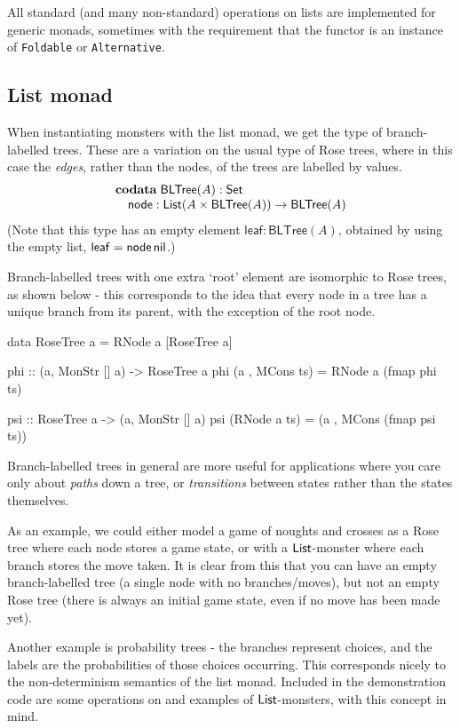 All standard (and many non-standard) operations on lists are implemented for generic monads, sometimes with the requirement that the functor is an instance of \verb+Foldable+ or \verb+Alternative+.

\subsection{List monad}

When instantiating monsters with the list monad, we get the type of branch-labelled trees. These are a variation on the usual type of Rose trees, where in this case the \emph{edges}, rather than the nodes, of the trees are labelled by values.
$$
\begin{array}[t]{l}
\mathbf{codata}\;
\mathsf{BLTree}(A):\mathsf{Set}\\
\quad \mathsf{node} : \mathsf{List}(A \times \mathsf{BLTree}(A)) \rightarrow \mathsf{BLTree}(A)
\end{array}
$$
(Note that this type has an empty element $\mathsf{leaf} : \mathsf{BLTree}(A)$, obtained by using the empty list, $\mathsf{leaf} = \mathsf{node}\,\mathsf{nil}$.)

Branch-labelled trees with one extra `root' element are isomorphic to Rose trees, as shown below - this corresponds to the idea that every node in a tree has a unique branch from its parent, with the exception of the root node.

\begin{haskell}
data RoseTree a = RNode a [RoseTree a]

phi :: (a, MonStr [] a) -> RoseTree a
phi (a , MCons ts) = RNode a (fmap phi ts)

psi :: RoseTree a -> (a, MonStr [] a)
psi (RNode a ts) = (a , MCons (fmap psi ts))
\end{haskell}

Branch-labelled trees in general are more useful for applications where you care only about \emph{paths} down a tree, or \emph{transitions} between states rather than the states themselves. 

As an example, we could either model a game of noughts and crosses as a Rose tree where each node stores a game state, or with a $\mathsf{List}$-monster where each branch stores the move taken. It is clear from this that you can have an empty branch-labelled tree (a single node with no branches/moves), but not an empty Rose tree (there is always an initial game state, even if no move has been made yet).

Another example is probability trees - the branches represent choices, and the labels are the probabilities of those choices occurring. This corresponds nicely to the non-determinism semantics of the list monad. Included in the demonstration code are some operations on and examples of $\mathsf{List}$-monsters, with this concept in mind. \\

